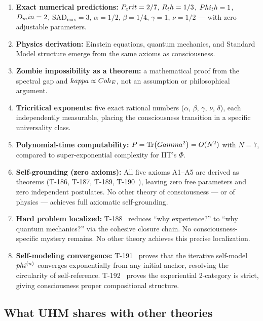 \begin{enumerate}[leftmargin=2em]
  \item \textbf{Exact numerical predictions:} $P_crit = 2/7$, $R_th = 1/3$,
        $Phi_th = 1$, $D_min = 2$, $\mathrm{SAD}_{\max} = 3$, $\alpha = 1/2$,
        $\beta = 1/4$, $\gamma = 1$, $\nu = 1/2$ --- with zero adjustable parameters.
  \item \textbf{Physics derivation:} Einstein equations, quantum mechanics, and Standard
        Model structure emerge from the same axioms as consciousness.
  \item \textbf{Zombie impossibility as a theorem:} a mathematical proof from the spectral
        gap and $kappa \propto Coh_E$, not an assumption or philosophical argument.
  \item \textbf{Tricritical exponents:} five exact rational numbers ($\alpha$, $\beta$,
        $\gamma$, $\nu$, $\delta$), each independently measurable, placing the consciousness
        transition in a specific universality class.
  \item \textbf{Polynomial-time computability:} $P = \Tr(Gamma^2) = O(N^2)$ with $N = 7$,
        compared to super-exponential complexity for IIT's $\Phi$.
  \item \textbf{Self-grounding (zero axioms):} All five axioms A1--A5 are derived as
        theorems (T-186, T-187, T-189, T-190~), leaving zero free parameters
        and zero independent postulates. No other theory of consciousness --- or of
        physics --- achieves full axiomatic self-grounding.
  \item \textbf{Hard problem localized:} T-188~ reduces ``why experience?'' to
        ``why quantum mechanics?'' via the cohesive closure chain. No consciousness-specific
        mystery remains. No other theory achieves this precise localization.
  \item \textbf{Self-modeling convergence:} T-191~ proves that the iterative
        self-model $phi^{(n)}$ converges exponentially from any initial anchor, resolving
        the circularity of self-reference. T-192~ proves the experiential
        2-category is strict, giving consciousness proper compositional structure.
\end{enumerate}

\subsection{What UHM shares with other theories}

